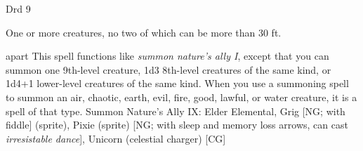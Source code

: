 
\begin{description*}
\item[Level:] Drd 9
\item[Effect:] One or more creatures, no two of which can be more than 30 ft.
\end{description*}

apart
This spell functions like \textit{summon nature's ally I}, except that you can
summon one 9th-level creature, 1d3 8th-level creatures of the same kind, or 1d4+1
lower-level creatures of the same kind.
When you use a summoning spell to summon an air, chaotic, earth, evil, fire, good,
lawful, or water creature, it is a spell of that type.
Summon Nature's Ally IX: Elder Elemental, Grig [NG; with fiddle] (sprite), Pixie (sprite) [NG; with sleep and memory loss arrows, can cast \textit{irresistable dance}], Unicorn (celestial charger) [CG]